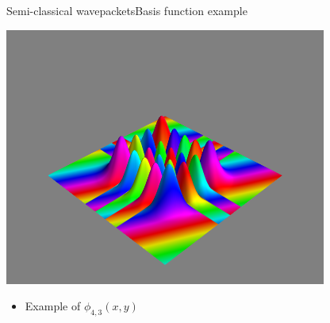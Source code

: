 \documentclass{beamer}
\begin{document}
\begin{frame}{Semi-classical wavepackets}{Basis function example}
  \begin{center}
    \centering
    \includegraphics[scale=0.4]{./fig/phi_4-3.png}
  \end{center}
  \begin{itemize}
  \item Example of $\phi_{4,3}(x,y)$
  \end{itemize}
\end{frame}
\end{document}
